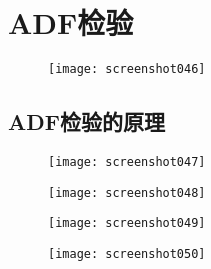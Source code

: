 \documentclass[11pt,a4paper,oneside]{book}
\begin{document}
\section{ADF检验}
\begin{figure}[H]
	\texttt{[image: screenshot046]}
	\label{fig:screenshot046}
\end{figure}
\subsection{ADF检验的原理}
\begin{figure}[H]
	\texttt{[image: screenshot047]}
	\label{fig:screenshot047}
\end{figure}
\begin{figure}[H]
	\texttt{[image: screenshot048]}
	\label{fig:screenshot048}
\end{figure}
\begin{figure}[H]
	\texttt{[image: screenshot049]}
	\label{fig:screenshot049}
\end{figure}
\begin{figure}[H]
	\texttt{[image: screenshot050]}
	\label{fig:screenshot050}
\end{figure}
\end{document}
